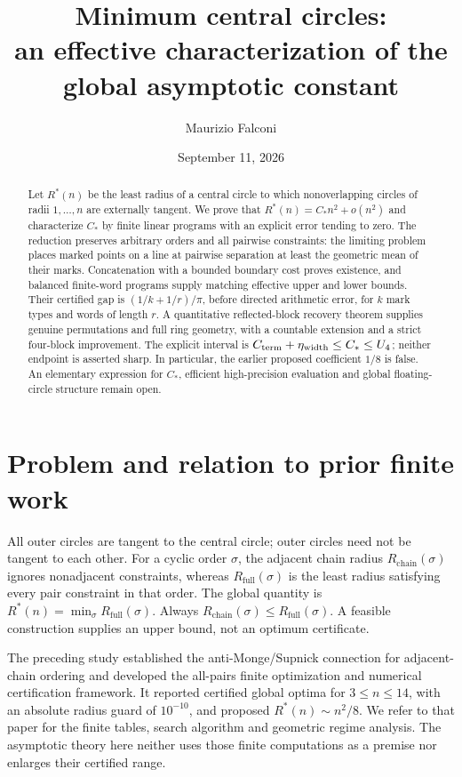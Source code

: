 \documentclass[11pt]{article}
\title{Minimum central circles:\\an effective characterization of the global asymptotic constant}
\author{Maurizio Falconi}
\date{September 11, 2026}
\theoremstyle{definition}\newtheorem{definition}[theorem]{Definition}
\theoremstyle{remark}\newtheorem{remark}[theorem]{Remark}
\newcommand{\Rstar}{R^\ast}
\newcommand{\ch}{R_{\mathrm{chain}}}
\newcommand{\full}{R_{\mathrm{full}}}
\newcommand{\CC}{C_\ast}
\begin{document}
\maketitle
\begin{abstract}
Let $\Rstar(n)$ be the least radius of a central circle to which nonoverlapping
circles of radii $1,\ldots,n$ are externally tangent. We prove that
$\Rstar(n)=\CC n^2+o(n^2)$ and characterize $\CC$ by finite linear programs
with an explicit error tending to zero. The reduction preserves arbitrary
orders and all pairwise constraints: the limiting problem places marked
points on a line at pairwise separation at least the geometric mean of their
marks. Concatenation with a bounded boundary cost proves existence, and
balanced finite-word programs supply matching effective upper and lower
bounds. Their certified gap is $(1/k+1/r)/\pi$, before directed arithmetic
error, for $k$ mark types and words of length $r$.
A quantitative reflected-block recovery theorem supplies genuine permutations
and full ring geometry, with a countable extension and a strict four-block
improvement. The explicit interval is
$C_{\rm term}+\eta_{\rm width}\le\CC\le U_4$; neither endpoint is asserted sharp.
In particular, the earlier proposed coefficient $1/8$ is false.
An elementary expression for $\CC$, efficient high-precision evaluation and
global floating-circle structure remain open.
\end{abstract}

\section{Problem and relation to prior finite work}

All outer circles are tangent to the central circle; outer circles need
not be tangent to each other. For a cyclic order $\sigma$, the adjacent
chain radius $\ch(\sigma)$ ignores nonadjacent constraints, whereas
$\full(\sigma)$ is the least radius satisfying every pair constraint in
that order. The global quantity is $\Rstar(n)=\min_\sigma\full(\sigma)$.
Always $\ch(\sigma)\le\full(\sigma)$. A feasible construction supplies
an upper bound, not an optimum certificate.

The preceding study \cite{v1} established the anti-Monge/Supnick connection
for adjacent-chain ordering and developed the all-pairs finite optimization
and numerical certification framework. It reported certified global optima
for $3\le n\le14$, with an absolute radius guard of $10^{-10}$, and proposed
$\Rstar(n)\sim n^2/8$. We refer to that paper for the finite tables, search
algorithm and geometric regime analysis. The asymptotic theory here neither
uses those finite computations as a premise nor enlarges their certified
range.
\end{document}
